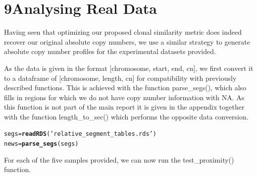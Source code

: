 \documentclass[12pt]{article}\usepackage[]{graphicx}\usepackage[]{color}
\makeatletter
\newcommand{\hlstr}[1]{\textcolor[rgb]{0.192,0.494,0.8}{#1}}%
\newcommand{\hlstd}[1]{\textcolor[rgb]{0.345,0.345,0.345}{#1}}%
\newcommand{\hlkwb}[1]{\textcolor[rgb]{0.69,0.353,0.396}{#1}}%
\newcommand{\hlkwd}[1]{\textcolor[rgb]{0.737,0.353,0.396}{\textbf{#1}}}%
\newenvironment{kframe}{%
 \def\at@end@of@kframe{}%
 \ifinner\ifhmode%
  \def\at@end@of@kframe{\end{minipage}}%
  \begin{minipage}{\columnwidth}%
 \fi\fi%
 \def\FrameCommand##1{\hskip\@totalleftmargin \hskip-\fboxsep
 \colorbox{shadecolor}{##1}\hskip-\fboxsep
     \hskip-\linewidth \hskip-\@totalleftmargin \hskip\columnwidth}%
 \MakeFramed {\advance\hsize-\width
   \@totalleftmargin\z@ \linewidth\hsize
   \@setminipage}}%
 {\par\unskip\endMakeFramed%
 \at@end@of@kframe}
\newenvironment{knitrout}{}{} %
\makeatother
\begin{document}
\newpage

\section*{9\quad Analysing Real Data}

Having seen that optimizing our proposed clonal similarity metric does indeed recover our original absolute copy numbers, we use a similar strategy to generate absolute copy number profiles for the experimental datasets provided.

As the data is given in the format [chromosome, start, end, cn], we first convert it to a dataframe of [chromosome, length, cn] for compatibility with previously described functions. This is achieved with the function parse\_segs(), which also fills in regions for which we do not have copy number information with NA. As this function is not part of the main report it is given in the appendix together with the function length\_to\_sec() which performs the opposite data conversion.



\begin{knitrout}
\color{fgcolor}\begin{kframe}
\begin{alltt}
\hlstd{segs} \hlkwb{=} \hlkwd{readRDS}\hlstd{(}\hlstr{'relative_segment_tables.rds'}\hlstd{)}
\hlstd{news} \hlkwb{=} \hlkwd{parse_segs}\hlstd{(segs)}
\end{alltt}
\end{kframe}
\end{knitrout}

For each of the five samples provided, we can now run the test\_proximity() function.
\end{document}
